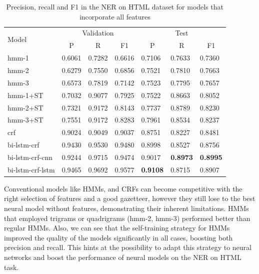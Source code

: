 \documentclass{nle}
\begin{document}
\begin{table}[h]
  \small
  \begin{center}
    \begin{tabular}{ lllllll }
      \toprule
      \multirow{2}{*}{Model} & \multicolumn{3}{c}{Validation} & \multicolumn{3}{c}{Test} \\
                             & \multicolumn{1}{c}{P} & \multicolumn{1}{c}{R} & \multicolumn{1}{c}{F1}
                             & \multicolumn{1}{c}{P} & \multicolumn{1}{c}{R} & \multicolumn{1}{c}{F1} \\
      \midrule
      hmm-1	         & 0.6061 & 0.7282 & 0.6616 & 0.7106 & 0.7633 & 0.7360 \\
      hmm-2	         & 0.6279 & 0.7550 & 0.6856 & 0.7521 & 0.7810 & 0.7663 \\
      hmm-3	         & 0.6573 & 0.7819 & 0.7142 & 0.7523 & 0.7795 & 0.7657 \\
      hmm-1+ST           & 0.7032 & 0.9077 & 0.7925 & 0.7522 & 0.8663 & 0.8052 \\
      hmm-2+ST           & 0.7321 & 0.9172 & 0.8143 & 0.7737 & 0.8789 & 0.8230 \\
      hmm-3+ST           & 0.7551 & 0.9172 & 0.8283 & 0.7961 & 0.8534 & 0.8237 \\
      crf	         & 0.9024 & 0.9049 & 0.9037 & 0.8751 & 0.8227 & 0.8481 \\
      bi-lstm-crf        & 0.9430 & 0.9530 & 0.9480 & 0.8998 & 0.8527 & 0.8756 \\
      bi-lstm-crf-cnn    & 0.9244 & 0.9715 & 0.9474 & 0.9017 & \textbf{0.8973} & \textbf{0.8995} \\
      bi-lstm-crf-lstm   & 0.9465 & 0.9692 & 0.9577 & \textbf{0.9108} & 0.8715 & 0.8907 \\
      \bottomrule
    \end{tabular}
  \end{center}
  \caption{Precision, recall and F1 in the NER on HTML dataset for models that incorporate all features}
  \label{tab:experiment2}
\end{table}

Conventional models like HMMs, and CRFs can become competitive with
the right selection of features and a good gazetteer, however they still lose
to the best neural model without features, demonstrating their inherent limitations.
HMMs that employed trigrams or quadrigrams (hmm-2, hmm-3) performed better than
regular HMMs. Also, we can see that the self-training strategy for HMMs improved 
the quality of the models significantly in all cases, boosting both precision and recall. 
This hints at the possibility to adapt this strategy to neural networks and boost
the performance of neural models on the NER on HTML task.
\end{document}
